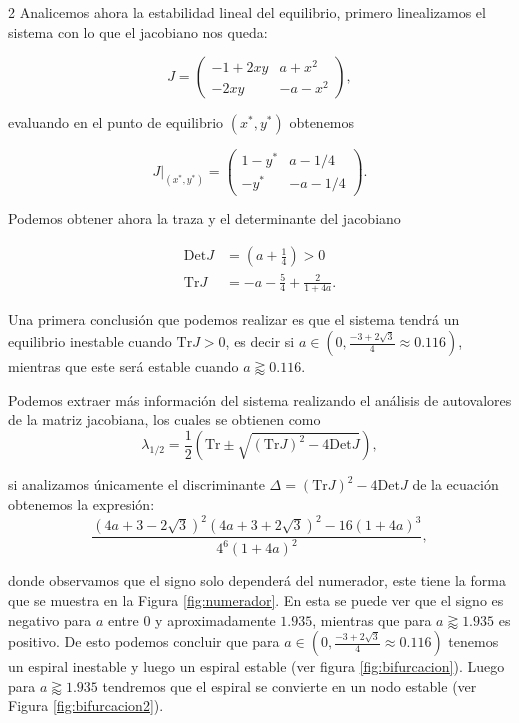 \documentclass[spanish, 12pt, a4paper]{article}
\begin{document}
\begin{multicols}{2}
Analicemos ahora la estabilidad lineal del equilibrio, primero linealizamos el sistema con lo que el jacobiano nos queda:

\begin{equation*}
    J = \begin{pmatrix}
        -1 + 2 x y & a + x^2 \\
        -2 x y & -a - x^2
    \end{pmatrix},
\end{equation*}

evaluando en el punto de equilibrio $(x^{*},y^{*})$ obtenemos

\begin{equation*}
    J|_{(x^{*},y^{*})} = \begin{pmatrix}
        1 - y^{*} & a - 1/4 \\
        - y^{*} & -a - 1/4
    \end{pmatrix}.
\end{equation*}

Podemos obtener ahora la traza y el determinante del jacobiano 

\begin{align*}
    \text{Det} J &= \left(a + \frac{1}{4}\right) > 0 \\
    \text{Tr} J &= - a - \frac{5}{4} + \frac{2}{1 + 4 a}.
\end{align*}

Una primera conclusión que podemos realizar es que el sistema tendrá un equilibrio inestable cuando 
$\text{Tr} J > 0$, es decir si $a \in \left(0, \frac{-3 + 2\sqrt{3}}{4} \approx 0.116\right)$, mientras que este será
estable cuando $a \gtrapprox 0.116$.

Podemos extraer más información del sistema realizando el análisis de autovalores de la matriz jacobiana, los cuales se obtienen como
\begin{equation*}
    \lambda_{1/2} = \frac{1}{2} \left( \text{Tr} \pm \sqrt{ (\text{Tr} J)^2 - 4 \text{Det} J}\right),
\end{equation*}

si analizamos únicamente el discriminante $\Delta = (\text{Tr} J)^2 - 4 \text{Det} J$ 
de la ecuación obtenemos la expresión:
\begin{equation*}
    \frac{\left(4 a + 3 - 2 \sqrt{3}\right)^2 \left(4 a + 3 + 2 \sqrt{3}\right)^2 - 16 \left(1 + 4a\right)^3}{4^{6} \left(1 + 4a\right)^2},
\end{equation*}

donde observamos que el signo solo dependerá del numerador, este tiene la forma que se muestra en la Figura \ref{fig:numerador}.
En esta se puede ver que el signo es negativo para $a$ entre 0 y aproximadamente $1.935$, mientras que para $a \gtrapprox 1.935$ es positivo.
De esto podemos concluir que para $a \in \left(0, \frac{-3 + 2\sqrt{3}}{4} \approx 0.116\right)$ tenemos un espiral inestable y luego un espiral estable (ver figura \ref{fig:bifurcacion}).
Luego para $a \gtrapprox 1.935$ tendremos que el espiral se convierte en un nodo estable (ver Figura \ref{fig:bifurcacion2}).



\end{multicols}
\end{document}
